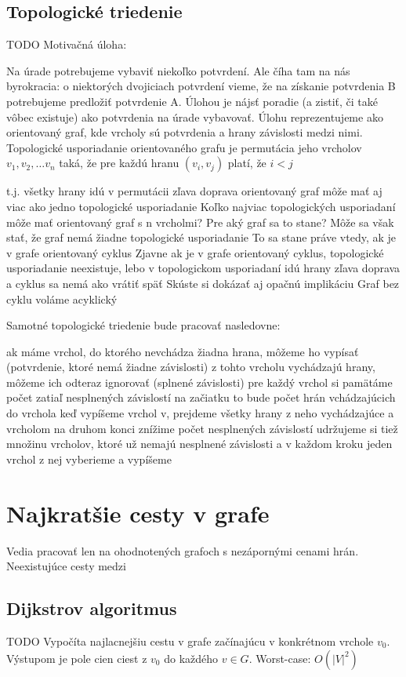 	\subsection{Topologické triedenie} TODO
Motivačná úloha:

Na úrade potrebujeme vybaviť niekoľko potvrdení. Ale číha tam na nás byrokracia: o niektorých dvojiciach potvrdení vieme, že na získanie potvrdenia B potrebujeme predložiť potvrdenie A.
Úlohou je nájsť poradie (a zistiť, či také vôbec existuje) ako potvrdenia na úrade vybavovať.
Úlohu reprezentujeme ako orientovaný graf, kde vrcholy sú potvrdenia a hrany závislosti medzi nimi.
Topologické usporiadanie orientovaného grafu je permutácia jeho vrcholov $v_{1},v_{2},\dots v_{n}$ taká, že pre každú hranu $(v_{i},v_{j})$ platí, že $i<j$

t.j. všetky hrany idú v permutácii zľava doprava
orientovaný graf môže mať aj viac ako jedno topologické usporiadanie
Koľko najviac topologických usporiadaní môže mať orientovaný graf s n vrcholmi? Pre aký graf sa to stane?
Môže sa však stať, že graf nemá žiadne topologické usporiadanie
To sa stane práve vtedy, ak je v grafe orientovaný cyklus
Zjavne ak je v grafe orientovaný cyklus, topologické usporiadanie neexistuje, lebo v topologickom usporiadaní idú hrany zľava doprava a cyklus sa nemá ako vrátiť späť
Skúste si dokázať aj opačnú implikáciu
Graf bez cyklu voláme acyklický

Samotné topologické triedenie bude pracovať nasledovne:

ak máme vrchol, do ktorého nevchádza žiadna hrana, môžeme ho vypísať (potvrdenie, ktoré nemá žiadne závislosti)
z tohto vrcholu vychádzajú hrany, môžeme ich odteraz ignorovať (splnené závislosti)
pre každý vrchol si pamätáme počet zatiaľ nesplnených závislostí
na začiatku to bude počet hrán vchádzajúcich do vrchola
keď vypíšeme vrchol v, prejdeme všetky hrany z neho vychádzajúce a vrcholom na druhom konci znížime počet nesplnených závislostí
udržujeme si tiež množinu vrcholov, ktoré už nemajú nesplnené závislosti a v každom kroku jeden vrchol z nej vyberieme a vypíšeme

\section{Najkratšie cesty v grafe}
	Vedia pracovať len na ohodnotených grafoch s nezápornými cenami hrán. Neexistujúce cesty medzi 
	\subsection{Dijkstrov algoritmus} TODO
		Vypočíta najlacnejšiu cestu v grafe začínajúcu v konkrétnom vrchole $v_{0}$. Výstupom je pole cien ciest z $v_{0}$ do každého $v \in G$.
		Worst-case: $O(|V|^{2})$
